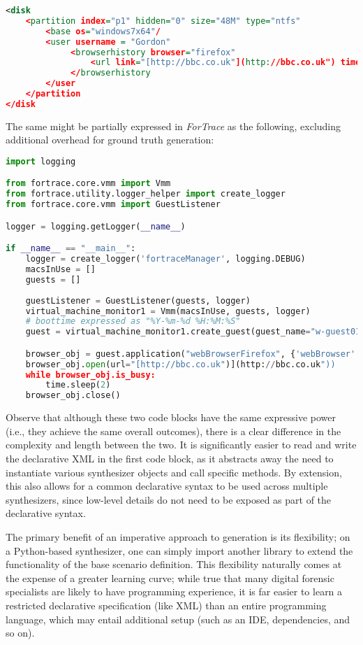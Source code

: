 \begin{lstlisting}[language=XML]
<disk
    <partition index="p1" hidden="0" size="48M" type="ntfs"
        <base os="windows7x64"/
        <user username = "Gordon"
             <browserhistory browser="firefox"
                 <url link="[http://bbc.co.uk"](http://bbc.co.uk") time="13:14:00 1 Jan 2013"/
             </browserhistory
        </user
    </partition
</disk
\end{lstlisting}

The same might be partially expressed in \emph{ForTrace} as the
following, excluding additional overhead for ground truth generation:

\begin{lstlisting}[language=Python]
import logging

from fortrace.core.vmm import Vmm
from fortrace.utility.logger_helper import create_logger
from fortrace.core.vmm import GuestListener

logger = logging.getLogger(__name__)

if __name__ == "__main__":
    logger = create_logger('fortraceManager', logging.DEBUG)
    macsInUse = []
    guests = []
    
    guestListener = GuestListener(guests, logger)
    virtual_machine_monitor1 = Vmm(macsInUse, guests, logger)
    # boottime expressed as "%Y-%m-%d %H:%M:%S"
    guest = virtual_machine_monitor1.create_guest(guest_name="w-guest01", platform="windows", boottime="2013-01-01 13:14:00")

    browser_obj = guest.application("webBrowserFirefox", {'webBrowser': "firefox"})
    browser_obj.open(url="[http://bbc.co.uk")](http://bbc.co.uk"))
    while browser_obj.is_busy:
        time.sleep(2)
    browser_obj.close()
\end{lstlisting}

Observe that although these two code blocks have the same expressive
power (i.e., they achieve the same overall outcomes), there is a clear
difference in the complexity and length between the two. It is
significantly easier to read and write the declarative XML in the first
code block, as it abstracts away the need to instantiate various
synthesizer objects and call specific methods. By extension, this also
allows for a common declarative syntax to be used across multiple
synthesizers, since low-level details do not need to be exposed as part
of the declarative syntax.

The primary benefit of an imperative approach to generation is its
flexibility; on a Python-based synthesizer, one can simply import
another library to extend the functionality of the base scenario
definition. This flexibility naturally comes at the expense of a greater
learning curve; while true that many digital forensic specialists are
likely to have programming experience, it is far easier to learn a
restricted declarative specification (like XML) than an entire
programming language, which may entail additional setup (such as an IDE,
dependencies, and so on).


